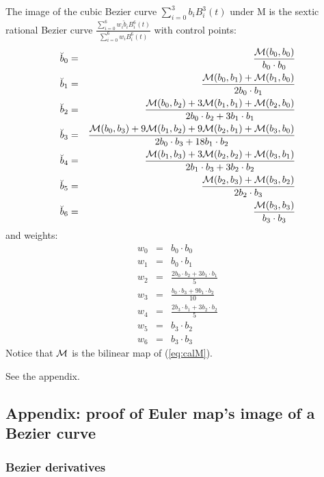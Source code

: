 \documentclass[11pt]{article}
\begin{document}
\begin{theorem}
\label{thm:imagecurve}
The image of the cubic Bezier curve $\sum_{i=0}^3 b_i B_i^3(t)$ under M 
is the sextic rational Bezier curve $\frac{\sum_{i=0}^6 w_i \breve{b}_i B_i^6(t)}
                                          {\sum_{i=0}^6 w_i B_i^6(t)}$ 
with control points:
\begin{eqnarray}
\breve{b}_0 & = & \frac{{\cal M}(b_0,b_0)}{b_0 \cdot b_0} \nonumber \\
\breve{b}_1 & = & \frac{{\cal M}(b_0,b_1) + {\cal M}(b_1,b_0)}{2b_0\cdot b_1} \nonumber \\
\breve{b}_2 & = & \frac{{\cal M}(b_0,b_2) + 3{\cal M}(b_1,b_1) + {\cal M}(b_2,b_0)}{2b_0 \cdot b_2 + 3b_1 \cdot b_1} \nonumber \\
\breve{b}_3 & = & \frac{{\cal M}(b_0,b_3) + 9{\cal M}(b_1,b_2) + 9{\cal M}(b_2,b_1) + {\cal M}(b_3,b_0)}{2b_0 \cdot b_3 + 18 b_1 \cdot b_2} \nonumber \\
\breve{b}_4 & = & \frac{{\cal M}(b_1,b_3) + 3{\cal M}(b_2,b_2) + {\cal M}(b_3,b_1)}{2b_1 \cdot b_3 + 3 b_2 \cdot b_2} \nonumber \\
\breve{b}_5 & = & \frac{{\cal M}(b_2,b_3) + {\cal M}(b_3,b_2)}{2b_2 \cdot b_3} \nonumber \\
\breve{b}_6 & = & \frac{{\cal M}(b_3,b_3)}{b_3 \cdot b_3} \nonumber
\end{eqnarray}
and weights:
\begin{eqnarray}
w_0 & = & b_0 \cdot b_0 \nonumber \\
w_1 & = & b_0 \cdot b_1 \nonumber \\
w_2 & = & \frac{2b_0 \cdot b_2 + 3b_1 \cdot b_1}{5} \nonumber \\
w_3 & = & \frac{b_0 \cdot b_3 + 9b_1 \cdot b_2}{10} \nonumber \\
w_4 & = & \frac{2b_3 \cdot b_1 + 3b_2 \cdot b_2}{5} \nonumber \\
w_5 & = & b_3 \cdot b_2 \nonumber \\
w_6 & = & b_3 \cdot b_3 \nonumber
\end{eqnarray}
Notice that ${\cal M}$ is the bilinear map of (\ref{eq:calM}).
\end{theorem}
\prf See the appendix.
\QED

\subsection{Appendix: proof of Euler map's image of a Bezier curve}
\label{sec:appendix}

\subsubsection{Bezier derivatives}
\end{document}
